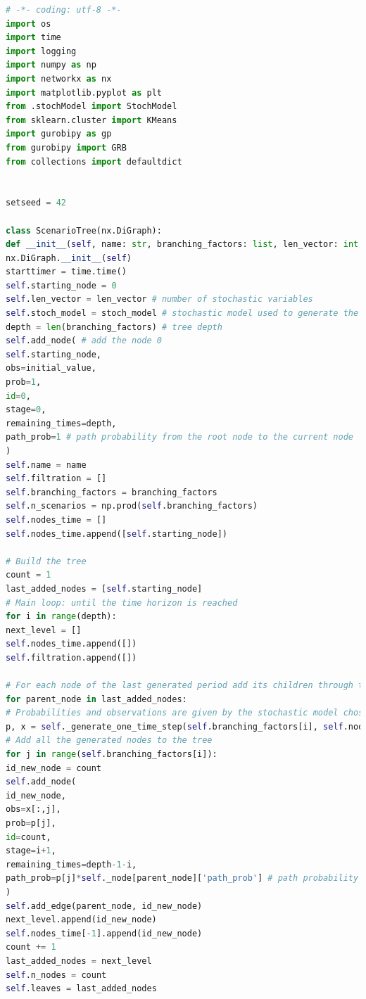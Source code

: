 \documentclass[a4paper,12pt]{article}
\begin{document}
\lstset{style=colorEX}
%
\begin{lstlisting}[language=python,caption={class ScenarioTree},label={lst:class-scenario-tree}]
# -*- coding: utf-8 -*-
import os
import time
import logging
import numpy as np
import networkx as nx
import matplotlib.pyplot as plt
from .stochModel import StochModel
from sklearn.cluster import KMeans
import gurobipy as gp
from gurobipy import GRB
from collections import defaultdict


setseed = 42

class ScenarioTree(nx.DiGraph):
def __init__(self, name: str, branching_factors: list, len_vector: int, initial_value, stoch_model: StochModel):
nx.DiGraph.__init__(self)
starttimer = time.time()
self.starting_node = 0
self.len_vector = len_vector # number of stochastic variables
self.stoch_model = stoch_model # stochastic model used to generate the tree
depth = len(branching_factors) # tree depth
self.add_node( # add the node 0  
self.starting_node,
obs=initial_value,
prob=1,
id=0,
stage=0,
remaining_times=depth,
path_prob=1 # path probability from the root node to the current node
)    
self.name = name
self.filtration = []
self.branching_factors = branching_factors
self.n_scenarios = np.prod(self.branching_factors)
self.nodes_time = []
self.nodes_time.append([self.starting_node])

# Build the tree
count = 1
last_added_nodes = [self.starting_node]
# Main loop: until the time horizon is reached
for i in range(depth):
next_level = []
self.nodes_time.append([])
self.filtration.append([])

# For each node of the last generated period add its children through the StochModel class
for parent_node in last_added_nodes:
# Probabilities and observations are given by the stochastic model chosen
p, x = self._generate_one_time_step(self.branching_factors[i], self.nodes[parent_node])
# Add all the generated nodes to the tree
for j in range(self.branching_factors[i]):
id_new_node = count
self.add_node(
id_new_node,
obs=x[:,j],
prob=p[j],
id=count,
stage=i+1,
remaining_times=depth-1-i,
path_prob=p[j]*self._node[parent_node]['path_prob'] # path probability from the root node to the current node
)
self.add_edge(parent_node, id_new_node)
next_level.append(id_new_node)
self.nodes_time[-1].append(id_new_node)
count += 1
last_added_nodes = next_level
self.n_nodes = count
self.leaves = last_added_nodes


\end{lstlisting}
\end{document}
